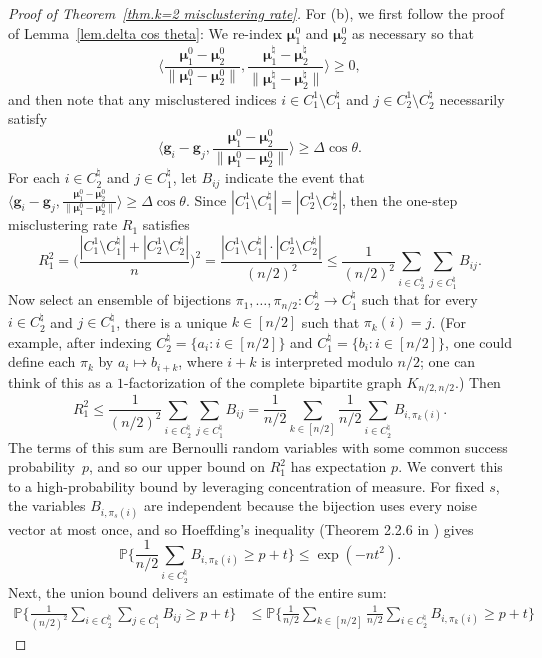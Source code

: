 \documentclass{article}
\theoremstyle{plain}
\theoremstyle{definition}
\newcommand{\1}{\mathbf{1}}
\newcommand{\hmu}{\bm{\mu}^\natural}
\newcommand{\bmu}{\bm{\mu}}
\begin{document}
\begin{proof}[Proof of Theorem~\ref{thm.k=2 misclustering rate}]
For (b), we first follow the proof of Lemma~\ref{lem.delta cos theta}: 
We re-index $\bmu^0_1$ and $\bmu^0_2$ as necessary so that
\[
\bigg\langle \frac{\bmu^0_1-\bmu^0_2}{\|\bmu^0_1-\bmu^0_2\|},\frac{\hmu_1-\hmu_2}{\|\hmu_1-\hmu_2\|}\bigg\rangle
\geq0,
\]
and then note that any misclustered indices $i\in C^1_1\setminus C^\natural_1$ and $j\in C^1_2\setminus C^\natural_2$ necessarily satisfy
\[
\bigg\langle \bm{g}_i-\bm{g}_j,\frac{\bmu^0_1-\bmu^0_2}{\|\bmu^0_1-\bmu^0_2\|}\bigg\rangle
\geq \Delta\cos\theta.
\]
For each $i\in C^\natural_2$ and $j\in C^\natural_1$, let $B_{ij}$ indicate the event that
$\langle \bm{g}_i-\bm{g}_j,\frac{\bmu^0_1-\bmu^0_2}{\|\bmu^0_1-\bmu^0_2\|}\rangle
\geq \Delta\cos\theta$.
Since $|C^1_1\setminus C^\natural_1|=|C^1_2\setminus C^\natural_2|$, then the one-step misclustering rate $R_1$ satisfies
\[
R_1^2
=\bigg(\frac{|C^1_1\setminus C^\natural_1|+|C^1_2\setminus C^\natural_2|}{n}\bigg)^2
=\frac{|C^1_1\setminus C^\natural_1|\cdot |C^1_2\setminus C^\natural_2|}{(n/2)^2}
\leq\frac{1}{(n/2)^2}\sum_{i\in C^\natural_2}\sum_{j\in C^\natural_1}B_{ij}.
\]
Now select an ensemble of bijections $\pi_1,\ldots,\pi_{n/2}\colon C^\natural_2\to C^\natural_1$ such that for every $i\in C^\natural_2$ and $j\in C^\natural_1$, there is a unique $k\in[n/2]$ such that $\pi_k(i)=j$.
(For example, after indexing $C^\natural_2=\{a_i:i\in[n/2]\}$ and $C^\natural_1=\{b_i:i\in[n/2]\}$, one could define each $\pi_k$ by $a_i\mapsto b_{i+k}$, where $i+k$ is interpreted modulo $n/2$; one can think of this as a $1$-factorization of the complete bipartite graph $K_{n/2,n/2}$.)
Then
\[
R_1^2
\leq\frac{1}{(n/2)^2}\sum_{i\in C^\natural_2}\sum_{j\in C^\natural_1}B_{ij}
=\frac{1}{n/2}\sum_{k\in [n/2]}\frac{1}{n/2}\sum_{i\in C^\natural_2}B_{i,\pi_k(i)}.
\]
The terms of this sum are Bernoulli random variables with some common success probability~$p$, and so our upper bound on $R_1^2$ has expectation $p$.
We convert this to a high-probability bound by leveraging concentration of measure.
For fixed $s$, the variables $B_{i,\pi_s(i)}$ are independent because the bijection uses every noise vector at most once, and so Hoeffding's inequality (Theorem 2.2.6 in \cite{vershynin2018high}) gives
\[
\mathbb{P}\bigg\{ \frac{1}{n/2} \sum_{i\in C_2^\natural} B_{i,\pi_k(i)} \ge p + t \bigg\} 
\le  \exp(-nt^2).
\]
Next, the union bound delivers an estimate of the entire sum:
\begin{align*}
\mathbb{P}\bigg\{
\frac{1}{(n/2)^2} \sum_{i\in C_2^\natural} \sum_{j\in C_1^\natural} B_{ij} \ge p + t \bigg\} 
& \le \mathbb{P}\bigg\{ \frac{1}{n/2}\sum_{k\in [n/2]}\frac{1}{n/2} \sum_{i\in C_2^\natural} B_{i,\pi_k(i)} \ge p + t \bigg\}

\end{align*}
\end{proof}
\end{document}
